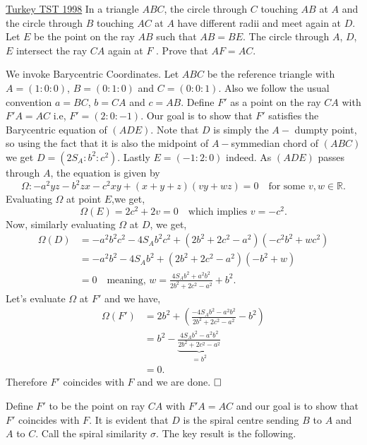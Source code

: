 \begin{problem}{9}{\href{https://artofproblemsolving.com/community/q2h449171p35492771}{Turkey TST 1998}} In a triangle $ABC$, the circle through $C$ touching $AB$ at $A$ and the circle through $B$ touching $AC$ at $A$ have diﬀerent radii and meet again at $D$. Let $E$ be the point on the ray $AB$ such that $AB = BE$. The circle through $A$, $D$, $E$ intersect the ray $CA$ again at $F$ . Prove that $AF = AC$.
	\begin{numsolution}{1} We invoke Barycentric Coordinates. Let $ABC$ be the reference triangle with $A=(1:0:0)$, $B=(0:1:0)$ and $C=(0:0:1)$. Also we follow the usual convention $a=BC$, $b=CA$ and $c=AB$. Define $F'$ as a point on the ray $CA$ with $F'A=AC$ i.e, $F'=(2:0:-1)$. Our goal is to show that $F'$ satisfies the Barycentric equation of $(ADE)$.
Note that $D$ is simply the $A-$ dumpty point, so using the fact that it is also the midpoint of $A-$symmedian chord of $(ABC)$ we get $D=(2S_A: b^2:c^2)$. Lastly $E=(-1:2:0)$ indeed. As $(ADE)$ passes through $A$, the equation is given by
$$\Omega: -a^2yz-b^2zx-c^2xy+(x+y+z)(vy+wz)=0\quad\text{for some $v,w\in\mathbb{R}$.}$$Evaluating $\Omega$ at point $E$,we get,
$$\Omega(E)=2c^2+2v=0\quad\text{which implies $v=-c^2$.}$$Now, similarly evaluating $\Omega$ at $D$, we get,
\begin{align*} \Omega(D)&=-a^2b^2c^2-4S_Ab^2c^2+(2b^2+2c^2-a^2)(-c^2b^2+wc^2)\\ &=-a^2b^2-4S_Ab^2+(2b^2+2c^2-a^2)(-b^2+w)\\ &=0 \quad\text{meaning, $w=\frac{4S_Ab^2+a^2b^2}{2b^2+2c^2-a^2}+b^2$.} \end{align*}Let's evaluate $\Omega$ at $F'$ and we have,
\begin{align*} \Omega(F')&=2b^2+\left(\frac{-4S_Ab^2-a^2b^2}{2b^2+2c^2-a^2}-b^2\right)\\ &=b^2-\underbrace{\frac{4S_Ab^2-a^2b^2}{2b^2+2c^2-a^2}}_{=b^2}\\ &=0. \end{align*}Therefore $F'$ coincides with $F$ and we are done. $\qedwhite$
	\end{numsolution}
	
	\begin{numsolution}{2} Define $F'$ to be the point on ray $CA$ with $F'A=AC$ and our goal is to show that $F'$ coincides with $F$. It is evident that $D$ is the spiral centre sending $B$ to $A$ and $A$ to $C$. Call the spiral similarity $\sigma$. The key result is the following.


\end{numsolution}
\end{problem}
